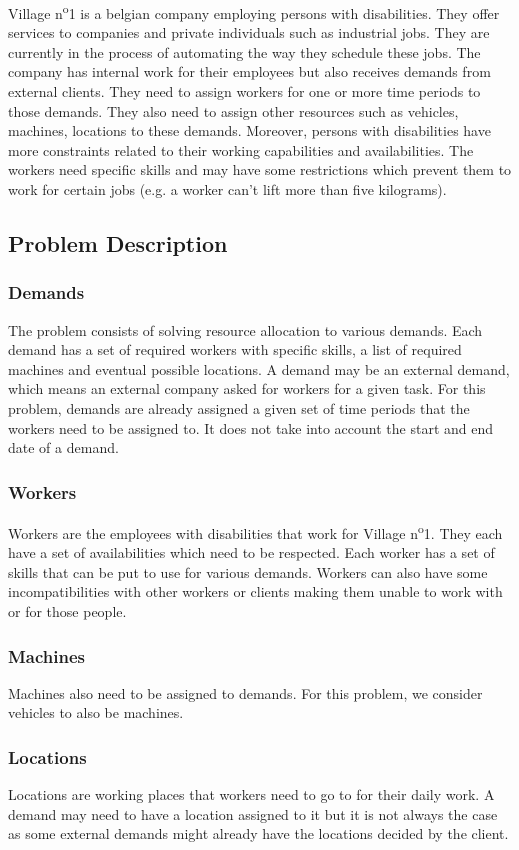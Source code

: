 \documentclass[../thesis.tex]{subfiles}
\begin{document}
Village n\textsuperscript{o}1 is a belgian company employing persons with disabilities.
They offer services to companies and private individuals such as industrial jobs.
They are currently in the process of automating the way they schedule these jobs. 
The company has internal work for their employees but also receives demands from external clients.
They need to assign workers for one or more time periods to those demands. They also need to assign other resources
such as vehicles, machines, locations to these demands.
Moreover, persons with disabilities have more constraints related to their working capabilities and
availabilities. The workers need specific skills and may have some restrictions which
prevent them to work for certain jobs (e.g. a worker can't lift more than five kilograms).


\subsection{Problem Description}

\subsubsection{Demands}

The problem consists of solving resource allocation to various demands. 
Each demand has a set of required workers with specific skills, a list of required machines and eventual possible locations.
A demand may be an external demand, which means an external company asked for workers for a given task.
For this problem, demands are already assigned a given set of time periods that the workers need to be assigned to. It does not take into account the 
start and end date of a demand.

\subsubsection{Workers}

Workers are the employees with disabilities that work for Village n\textsuperscript{o}1. They each have a set of availabilities which need to 
be respected. Each worker has a set of skills that can be put to use for various demands. 
Workers can also have some incompatibilities with other workers or clients making them unable to work with or for those people.

\subsubsection{Machines}

Machines also need to be assigned to demands. For this problem, we consider vehicles to also be machines.

\subsubsection{Locations}

Locations are working places that workers need to go to for their daily work. A demand may need to have a location assigned to it but it is not always the case 
as some external demands might already have the locations decided by the client.
\end{document}
